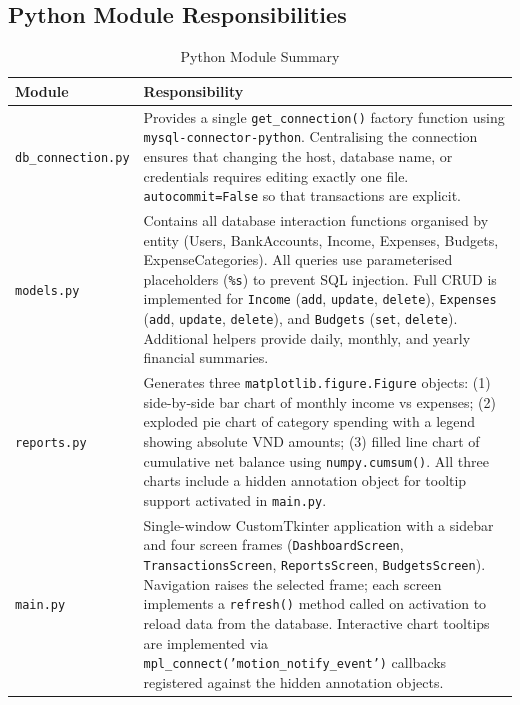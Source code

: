 \documentclass[12pt, a4paper]{article}
\begin{document}
\subsection{Python Module Responsibilities}

\begin{table}[H]
\centering
\caption{Python Module Summary}
\begin{tabularx}{\textwidth}{lX}
\toprule
\textbf{Module} & \textbf{Responsibility} \\
\midrule
\texttt{db\_connection.py}
  & Provides a single \texttt{get\_connection()} factory function using
    \texttt{mysql-connector-python}. Centralising the connection ensures that
    changing the host, database name, or credentials requires editing exactly
    one file. \texttt{autocommit=False} so that transactions are explicit. \\
\addlinespace
\texttt{models.py}
  & Contains all database interaction functions organised by entity
    (Users, BankAccounts, Income, Expenses, Budgets, ExpenseCategories).
    All queries use parameterised placeholders (\texttt{\%s}) to prevent SQL
    injection. Full CRUD is implemented for \texttt{Income}
    (\texttt{add}, \texttt{update}, \texttt{delete}), \texttt{Expenses}
    (\texttt{add}, \texttt{update}, \texttt{delete}), and \texttt{Budgets}
    (\texttt{set}, \texttt{delete}). Additional helpers provide daily, monthly,
    and yearly financial summaries. \\
\addlinespace
\texttt{reports.py}
  & Generates three \texttt{matplotlib.figure.Figure} objects:
    (1) side-by-side bar chart of monthly income vs expenses;
    (2) exploded pie chart of category spending with a legend showing absolute
    VND amounts; (3) filled line chart of cumulative net balance using
    \texttt{numpy.cumsum()}. All three charts include a hidden annotation object
    for tooltip support activated in \texttt{main.py}. \\
\addlinespace
\texttt{main.py}
  & Single-window CustomTkinter application with a sidebar and four screen
    frames (\texttt{DashboardScreen}, \texttt{TransactionsScreen},
    \texttt{ReportsScreen}, \texttt{BudgetsScreen}). Navigation raises the
    selected frame; each screen implements a \texttt{refresh()} method called
    on activation to reload data from the database. Interactive chart tooltips
    are implemented via \texttt{mpl\_connect('motion\_notify\_event')}
    callbacks registered against the hidden annotation objects. \\
\bottomrule
\end{tabularx}
\end{table}
\end{document}
